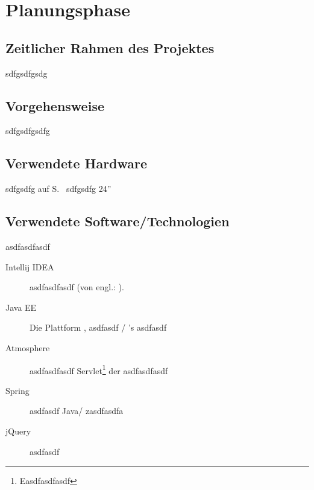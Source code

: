 \section{Planungsphase}
\label{sec:Planungsphase}

\subsection{Zeitlicher Rahmen des Projektes}
\label{sub:Zeitlicher Rahmen des Projektes}
sdfgsdfgsdg

\subsection{Vorgehensweise}
\label{sub:Vorgehensweise}
sdfgsdfgsdfg

\subsection{Verwendete Hardware}
\label{sub:Verwendete Hardware}
sdfgsdfg  auf S.~\pageref{app:Laptop-Spezifikation} sdfgsdfg 24''

\subsection{Verwendete Software/Technologien}
\label{sub:Verwendete Software/Technologien}
asdfasdfasdf
\begin{description}
    \item [Intellij IDEA] asdfasdfasdf (von engl.: ).
    \item [Java EE]
    Die Plattform , asdfasdf / 's asdfasdf
    \item [Atmosphere]
    asdfasdfasdf Servlet\footnote{Easdfasdfasdf}  der asdfasdfasdf
    \item [Spring]
    asdfasdf Java/ zasdfasdfa
    \item [jQuery]
    asdfasdf
\end{description}